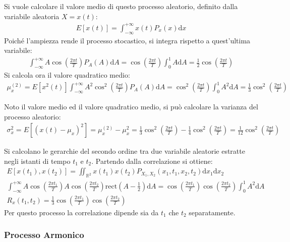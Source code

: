 \documentclass{article}
\newcommand{\rect}{\mathrm{rect}}
\newcommand{\df}{\mathrm{d}}
\numberwithin{equation}{subsection}
\begin{document}
Si vuole calcolare il valore medio di questo processo aleatorio, definito dalla variabile aleatoria $X=x(t)$:
\begin{gather*}
    E[x(t)]=\displaystyle\int_{-\infty}^{+\infty}x(t)P_x(x)\df x
\end{gather*}
Poiché l'ampiezza rende il processo stocastico, si integra rispetto a quest'ultima variabile:
\begin{gather*}
    \displaystyle\int_{-\infty}^{+\infty}A\cos\left(\frac{2\pi t}{T}\right)P_A(A)\df A=\cos\left(\frac{2\pi t}{T}\right)\int_0^1A\df A=\frac{1}{2}\cos\left(\frac{2\pi t}{T}\right)
\end{gather*}
Si calcola ora il valore quadratico medio:
\begin{gather*}
    \mu_x^{(2)}=E[x^2(t)]\displaystyle\int_{-\infty}^{+\infty}A^2\cos^2\left(\frac{2\pi t}{T}\right)P_A(A)\df A=\cos^2\left(\frac{2\pi t}{T}\right)\int_0^1A^2\df A=\frac{1}{3}\cos^2\left(\frac{2\pi t}{T}\right)
\end{gather*}


Noto il valore medio ed il valore quadratico medio, si può calcolare la varianza del processo aleatorio:
\begin{gather*}
    \sigma_x^2=E[(x(t)-\mu_x)^2]=\mu_x^{(2)}-\mu_x^2=\displaystyle\frac{1}{3}\cos^2\left(\frac{2\pi t}{T}\right)-\frac{1}{4}\cos^2\left(\frac{2\pi t}{T}\right)=\frac{1}{12}\cos^2\left(\frac{2\pi t}{T}\right)
\end{gather*}

Si calcolano le gerarchie del secondo ordine tra due variabile aleatorie estratte negli istanti di tempo $t_1$ e $t_2$. Partendo dalla correlazione si ottiene:
\begin{gather*}
    E[x(t_1),x(t_2)]=\displaystyle\iint_{\mathbb{R}^2}x(t_1)x(t_2)P_{X_1,X_2}(x_1,t_1,x_2,t_2)\df x_1\df x_2\\    
    \displaystyle\int_{-\infty}^{+\infty}A\cos\left(\frac{2\pi t_1}{T}\right)A\cos\left(\frac{2\pi t_2}{T}\right)\rect\displaystyle\left(A-\frac{1}{2}\right)\df A=\cos\left(\frac{2\pi t_1}{T}\right)\cos\left(\frac{2\pi t_2}{T}\right)\int_0^1A^2\df A\\
    R_{x}(t_1,t_2)=\displaystyle\frac{1}{3}\cos\left(\frac{2\pi t_1}{T}\right)\cos\left(\frac{2\pi t_2}{T}\right)
\end{gather*}
Per questo processo la correlazione dipende sia da $t_1$ che $t_2$ separatamente. 

\subsubsection{Processo Armonico}
\end{document}
